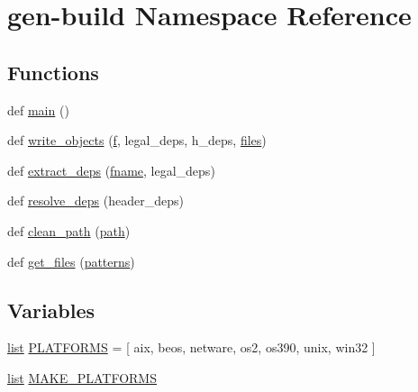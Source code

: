 \hypertarget{namespacegen-build}{}\section{gen-\/build Namespace Reference}
\label{namespacegen-build}
\subsection*{Functions}
\begin{DoxyCompactItemize}
\item 
def \hyperlink{namespacegen-build_a303de3964ffc3ff5955d16fd7ed6aa55}{main} ()
\item 
def \hyperlink{namespacegen-build_a72863c184bb8734b32f7480d89f664ce}{write\+\_\+objects} (\hyperlink{pcregrep_8txt_a588c778c1c1509e472f22dc36efb005e}{f}, legal\+\_\+deps, h\+\_\+deps, \hyperlink{pcregrep_8txt_a5aaeef01bce395cfcb41dd64a3bf8607}{files})
\item 
def \hyperlink{namespacegen-build_ae04145837dc1f16d63faf1c2853fef79}{extract\+\_\+deps} (\hyperlink{group__apr__proc__mutex_ga6a2fc0c236288b07ce5bd1335ca89fa2}{fname}, legal\+\_\+deps)
\item 
def \hyperlink{namespacegen-build_ad10a7a9d086bd1923df405f9d928e6bd}{resolve\+\_\+deps} (header\+\_\+deps)
\item 
def \hyperlink{namespacegen-build_af6d7251642e30bfe9bd19cec915968fb}{clean\+\_\+path} (\hyperlink{ab_8c_a3b02c6de5c049804444a246f7fdf46b4}{path})
\item 
def \hyperlink{namespacegen-build_ae60d7eb60e53d27cf693a1efb8b3c278}{get\+\_\+files} (\hyperlink{pcregrep_8txt_aca23d6bf5b793a5e2a75a714f962e664}{patterns})
\end{DoxyCompactItemize}
\subsection*{Variables}
\begin{DoxyCompactItemize}
\item 
\hyperlink{pcregrep_8txt_aeb6b944e4524f915483b5696b7f2f424}{list} \hyperlink{namespacegen-build_a6482e6bb2675ffd159f402ddc5582e9e}{P\+L\+A\+T\+F\+O\+R\+MS} = \mbox{[} \textquotesingle{}aix\textquotesingle{}, \textquotesingle{}beos\textquotesingle{}, \textquotesingle{}netware\textquotesingle{}, \textquotesingle{}os2\textquotesingle{}, \textquotesingle{}os390\textquotesingle{}, \textquotesingle{}unix\textquotesingle{}, \textquotesingle{}win32\textquotesingle{} \mbox{]}
\item 
\hyperlink{pcregrep_8txt_aeb6b944e4524f915483b5696b7f2f424}{list} \hyperlink{namespacegen-build_a5f35a11490cb7a34729806229e259267}{M\+A\+K\+E\+\_\+\+P\+L\+A\+T\+F\+O\+R\+MS}
\end{DoxyCompactItemize}


